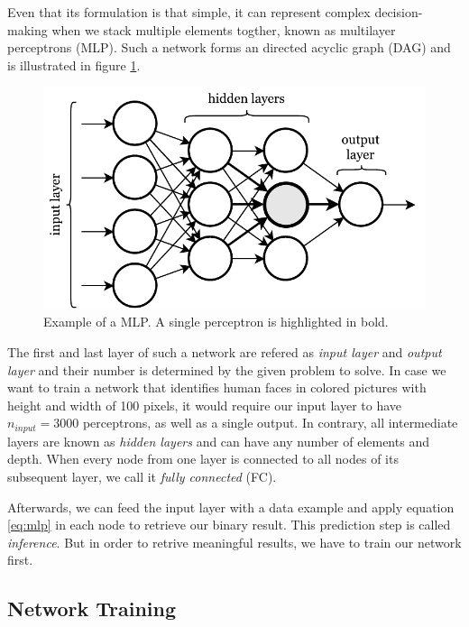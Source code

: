 Even that its formulation is that simple, it can represent complex decision-making when we stack multiple elements togther, known as multilayer perceptrons (MLP). Such a network forms an directed acyclic graph (DAG) and is illustrated in figure \ref{fig:mlp}.

\begin{figure}[htpb]
	\centering
	\includegraphics[scale=0.8]{figures/mlp.pdf}
	\caption[Multilayer perceptron]{Example of a MLP. A single perceptron is highlighted in bold.} \label{fig:mlp}
\end{figure}

The first and last layer of such a network are refered as \textit{input layer} and \textit{output layer} and their number is determined by the given problem to solve. In case we want to train a network that identifies human faces in colored pictures with height and width of 100 pixels, it would require our input layer to have $ n_{input}=3000 $ perceptrons, as well as a single output. In contrary, all intermediate layers are known as \textit{hidden layers} and can have any number of elements and depth. When every node from one layer is connected to all nodes of its subsequent layer, we call it \textit{fully connected} (FC).

Afterwards, we can feed the input layer with a data example and apply equation \ref{eq:mlp} in each node to retrieve our binary result. This prediction step is called \textit{inference}. But in order to retrive meaningful results, we have to train our network first.

\subsection{Network Training}


